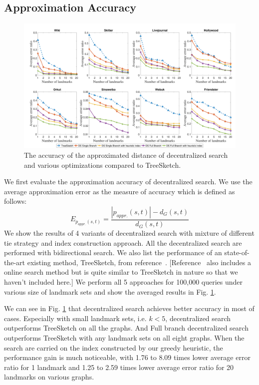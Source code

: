 \subsection{Approximation Accuracy}
\label{eval_accuracy}

\begin{figure}[t]
    \centering
    \includegraphics[width=\linewidth]{./figures/accuracy_stepy.pdf}
    \caption{The accuracy of the approximated distance of decentralized search and various optimizations compared to TreeSketch.}
    \label{fig:accuracy_stepy}
\end{figure}

We first evaluate the approximation accuracy of decentralized search. We use the average approximation error as the measure of accuracy which is defined as follows:
\[
E_{p_{appr.}(s,t)} = \frac{|p_{appr.}(s,t)| - d_G(s,t)}{d_G(s,t)}
\]
We show the results of 4 variants of decentralized search with mixture of different tie strategy and index construction approach. All the decentralized search are performed with bidirectional search. We also list the performance of an state-of-the-art existing method, TreeSketch, from reference~\cite{Gubichev:2010:FAE:1871437.1871503}. [Reference~\cite{6399472} also includes a online search method but is quite similar to TreeSketch in nature so that we haven't included here.] We perform all 5 approaches for 100,000 queries under various size of landmark sets and show the averaged results in Fig. \ref{fig:accuracy_stepy}.

We can see in Fig. \ref{fig:accuracy_stepy} that decentralized search achieves better accuracy in most of cases. Especially with small landmark sets, i.e. $k < 5$, decentralized search outperforms TreeSketch on all the graphs. And Full branch decentralized search outperforms TreeSketch with any landmark sets on all eight graphs. When the search are carried on the index constructed by our greedy heuristic, the performance gain is much noticeable, with 1.76 to 8.09 times lower average error ratio for 1 landmark and 1.25 to 2.59 times lower average error ratio for 20 landmarks on various graphs.

